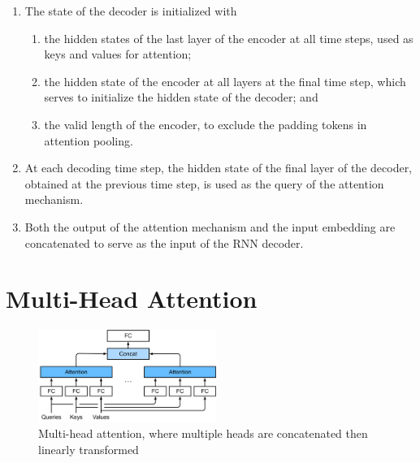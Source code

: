 \begin{enumerate}
    \item The state of the decoder is initialized with 
    \begin{enumerate}
        \item the hidden states of the last layer of the encoder at all time steps, used as keys and values for attention; 
        
        \item the hidden state of the encoder at all layers at the final time step, which serves to initialize the hidden state of the decoder; and 
    
        \item the valid length of the encoder, to exclude the padding tokens in attention pooling. 

    \end{enumerate}
    
    
    \item At each decoding time step, the hidden state of the final layer of the decoder, obtained at the previous time step, is used as the query of the attention mechanism. 
    
    \item Both the output of the attention mechanism and the input embedding are concatenated to serve as the input of the RNN decoder.

\end{enumerate}





\section{Multi-Head Attention \cite{dnn-1}} \label{Multi-Head Attention}

\begin{figure}[H]
    \centering
    \includegraphics[width=\linewidth, height=3cm, keepaspectratio]{Pictures/deep_neural_networks/multi-head-attention.jpg}
    \caption*{Multi-head attention, where multiple heads are concatenated then linearly transformed}
\end{figure}


